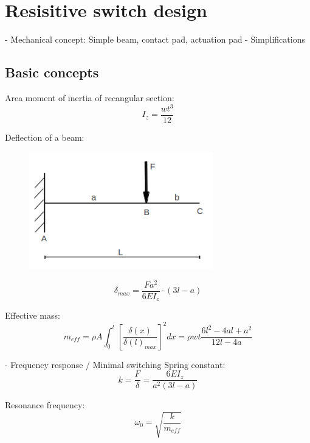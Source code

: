 \section{Resisitive switch design}
\label{sec:resisitive_switch_design}
- Mechanical concept: Simple beam, contact pad, actuation pad
- Simplifications

\subsection{Basic concepts}
\label{sec:basic_concepts}
Area moment of inertia of recangular section:
\begin{equation}
	I_z = \frac{wt^3}{12}
	\label{eq:area_moment_of_inertia}
\end{equation}

Deflection of a beam:
\begin{figure}[h]
	\centering
	\includegraphics[width=8cm]{fig/cantilever_beam_single_load.png}
	\label{fig:cantilever_beam_single_load}
\end{figure}

\begin{equation}
	\delta_{max} = \frac{Fa^2}{6EI_z}\cdot(3l-a)
	\label{eq:beam_deflection}
\end{equation}

Effective mass:
\begin{equation}
	m_{eff} = \rho A \int_0^l{\left[\frac{\delta(x)}{\delta(l)_{max}}\right]^2dx} = \rho wt\frac{6l^2-4al+a^2}{12l-4a}
	\label{eq:effective_mass}
\end{equation}


- Frequency response / Minimal switching
Spring constant:
\begin{equation}
	k = \frac{F}{\delta} = \frac{6EI_z}{a^2(3l-a)}
	\label{eq:spring_constant}
\end{equation}

Resonance frequency:
\begin{equation}
	\omega_0 = \sqrt{\frac{k}{m_{eff}}}
	\label{eq:resonance_frequency}
\end{equation}

